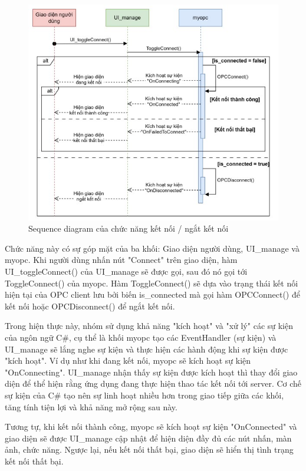\begin{figure}[H]
    \centering
    \includegraphics[width=1\textwidth]{Images/Implementation/VRapp/VR_connect_toggle.jpg}
    \caption{Sequence diagram của chức năng kết nối / ngắt kết nối}
    \label{fig:seq_vr_connect}
\end{figure}

Chức năng này có sự góp mặt của ba khối: Giao diện người dùng, UI\_manage và myopc. Khi người dùng nhấn nút "Connect" trên giao diện, hàm UI\_toggleConnect() của UI\_manage sẽ được gọi, sau đó nó gọi tới ToggleConnect() của myopc. Hàm ToggleConnect() sẽ dựa vào trạng thái kết nối hiện tại của OPC client lưu bởi biến is\_connected mà gọi hàm OPCConnect() để kết nối hoặc OPCDisconnect() để ngắt kết nối.

Trong hiện thực này, nhóm sử dụng khả năng "kích hoạt" và "xử lý" các sự kiện của ngôn ngữ C\#, cụ thể là khối myopc tạo các EventHandler (sự kiện) và UI\_manage sẽ lắng nghe sự kiện và thực hiện các hành động khi sự kiện được "kích hoạt". Ví dụ như khi đang kết nối, myopc sẽ kích hoạt sự kiện "OnConnecting". UI\_manage nhận thấy sự kiện được kích hoạt thì thay đổi giao diện để thể hiện rằng ứng dụng đang thực hiện thao tác kết nối tới server. Cơ chế sự kiện của C\# tạo nên sự linh hoạt nhiều hơn trong giao tiếp giữa các khối, tăng tính tiện lợi và khả năng mở rộng sau này. 

Tương tự, khi kết nối thành công, myopc sẽ kích hoạt sự kiện "OnConnected" và giao diện sẽ được UI\_manage cập nhật để hiện diện đầy đủ các nút nhấn, màn ảnh, chức năng. Ngược lại, nếu kết nối thất bại, giao diện sẽ hiển thị tình trạng kết nối thất bại.

